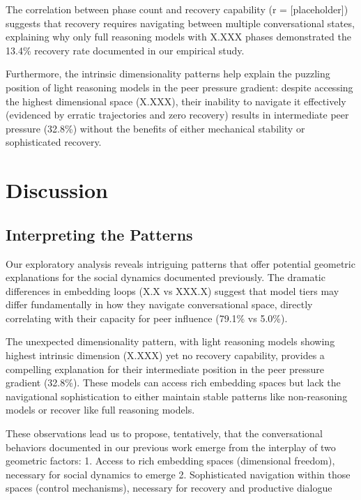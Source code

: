 \documentclass[11pt,letterpaper]{article}
\newcommand{\fullReasoningPeerPressure}{79.1\%}
\newcommand{\lightReasoningPeerPressure}{32.8\%}
\newcommand{\nonReasoningPeerPressure}{5.0\%}
\newcommand{\fullReasoningRecovery}{13.4\%}
\newcommand{\lightIntrinsicDim}{X.XXX}
\newcommand{\fullPhaseCount}{X.XXX}
\newcommand{\fullLoops}{X.X}
\newcommand{\nonLoops}{XXX.X}
\begin{document}
The correlation between phase count and recovery capability (r = [placeholder]) suggests that recovery requires navigating between multiple conversational states, explaining why only full reasoning models with \fullPhaseCount{} phases demonstrated the \fullReasoningRecovery{} recovery rate documented in our empirical study.

Furthermore, the intrinsic dimensionality patterns help explain the puzzling position of light reasoning models in the peer pressure gradient: despite accessing the highest dimensional space (\lightIntrinsicDim{}), their inability to navigate it effectively (evidenced by erratic trajectories and zero recovery) results in intermediate peer pressure (\lightReasoningPeerPressure{}) without the benefits of either mechanical stability or sophisticated recovery.

\section{Discussion}

\subsection{Interpreting the Patterns}

Our exploratory analysis reveals intriguing patterns that offer potential geometric explanations for the social dynamics documented previously. The dramatic differences in embedding loops (\fullLoops{} vs \nonLoops{}) suggest that model tiers may differ fundamentally in how they navigate conversational space, directly correlating with their capacity for peer influence (\fullReasoningPeerPressure{} vs \nonReasoningPeerPressure{}).

The unexpected dimensionality pattern, with light reasoning models showing highest intrinsic dimension (\lightIntrinsicDim{}) yet no recovery capability, provides a compelling explanation for their intermediate position in the peer pressure gradient (\lightReasoningPeerPressure{}). These models can access rich embedding spaces but lack the navigational sophistication to either maintain stable patterns like non-reasoning models or recover like full reasoning models.

These observations lead us to propose, tentatively, that the conversational behaviors documented in our previous work emerge from the interplay of two geometric factors:
1. Access to rich embedding spaces (dimensional freedom), necessary for social dynamics to emerge
2. Sophisticated navigation within those spaces (control mechanisms), necessary for recovery and productive dialogue
\end{document}
